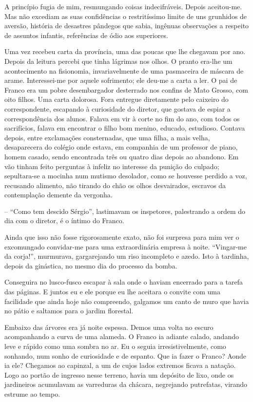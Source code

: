 A princípio fugia de mim, resmungando coisas
indecifráveis. Depois aceitou{}-me. Mas não excediam as suas
confidências o restritíssimo limite de uns grunhidos de aversão,
história de desastres pândegos que sabia, ingênuas observações a
respeito de assuntos infantis, referências de ódio aos superiores. 

Uma vez recebeu carta da província, uma das poucas que lhe chegavam por
ano. Depois da leitura percebi que tinha lágrimas nos olhos. O pranto
era{}-lhe um acontecimento na fisionomia, invariavelmente de uma
pasmaceira de máscara de arame. Interessei{}-me por aquele sofrimento;
ele deu{}-me a carta a ler. O pai de Franco era um pobre desembargador
desterrado nos confins de Mato Grosso, com oito filhos. Uma carta
dolorosa. Fora entregue diretamente pelo caixeiro do correspondente,
escapando à curiosidade do diretor, que gostava de espiar a
correspondência dos alunos. Falava em vir à corte no fim do ano, com
todos os sacrifícios, falava em encontrar o filho bom menino, educado,
estudioso. Contava depois, entre exclamações consternadas, que uma
filha, a mais velha, desaparecera do colégio onde estava, em companhia
de um professor de piano, homem casado, sendo encontrada três ou quatro
dias depois ao abandono. Em vão tinham feito perguntas à infeliz no
interesse da punição do culpado; sepultara{}-se a mocinha num mutismo
desolador, como se houvesse perdido a voz, recusando alimento, não
tirando do chão os olhos desvairados, escravos da contemplação demente da vergonha. 

-- ``Como tem descido Sérgio'', lastimavam os inspetores, 
palestrando a ordem do dia com o diretor, é o íntimo do Franco. 

Ainda que isso não fosse rigorosamente exato, não foi
surpresa para mim ver o excomungado convidar{}-me para uma
extraordinária empresa à noite. ``Vingar{}-me da corja!'', murmurava,
gargarejando um riso incompleto e azedo. Isto à tardinha, depois da
ginástica, no mesmo dia do processo da bomba. 

Conseguira no lusco{}-fusco escapar à sala onde o haviam encerrado para a 
tarefa das páginas. E juntos eu e ele porque eu lhe aceitara o convite com uma
facilidade que ainda hoje não compreendo, galgamos um canto de muro que
havia no pátio e saltamos para o jardim florestal. 

Embaixo das árvores
era já noite espessa. Demos uma volta no escuro acompanhando a curva de
uma alameda. O Franco ia adiante calado, andando leve e rápido como uma
sombra no ar. Eu o seguia irresistivelmente, como sonhando, num sonho
de curiosidade e de espanto. Que ia fazer o Franco? Aonde ia ele?
Chegamos ao capinzal, a um de cujos lados extremos ficava a natação.
Logo ao portão de ingresso nesse terreno, havia um depósito de lixo,
onde os jardineiros acumulavam as varreduras da chácara, negrejando
putrefatas, virando estrume ao tempo. 

